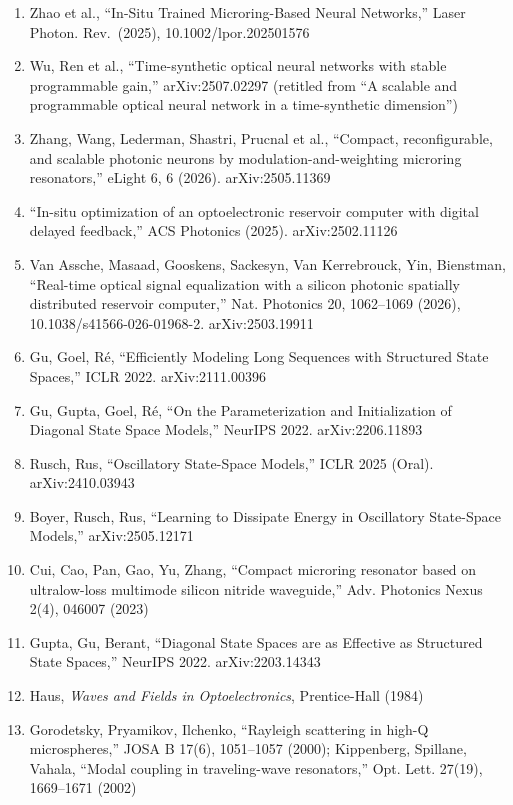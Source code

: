 \documentclass[
  10pt,
]{article}
\begin{document}
\begin{enumerate}
  arXiv:2506.14575
\item
  Zhao et al., ``In-Situ Trained Microring-Based Neural Networks,''
  Laser Photon. Rev.~(2025), 10.1002/lpor.202501576
\item
  Wu, Ren et al., ``Time-synthetic optical neural networks with stable
  programmable gain,'' arXiv:2507.02297 (retitled from ``A scalable and
  programmable optical neural network in a time-synthetic dimension'')
\item
  Zhang, Wang, Lederman, Shastri, Prucnal et al., ``Compact,
  reconfigurable, and scalable photonic neurons by
  modulation-and-weighting microring resonators,'' eLight 6, 6 (2026).
  arXiv:2505.11369
\item
  ``In-situ optimization of an optoelectronic reservoir computer with
  digital delayed feedback,'' ACS Photonics (2025). arXiv:2502.11126
\item
  Van Assche, Masaad, Gooskens, Sackesyn, Van Kerrebrouck, Yin,
  Bienstman, ``Real-time optical signal equalization with a silicon
  photonic spatially distributed reservoir computer,'' Nat. Photonics
  20, 1062--1069 (2026), 10.1038/s41566-026-01968-2. arXiv:2503.19911
\item
  Gu, Goel, Ré, ``Efficiently Modeling Long Sequences with Structured
  State Spaces,'' ICLR 2022. arXiv:2111.00396
\item
  Gu, Gupta, Goel, Ré, ``On the Parameterization and Initialization of
  Diagonal State Space Models,'' NeurIPS 2022. arXiv:2206.11893
\item
  Rusch, Rus, ``Oscillatory State-Space Models,'' ICLR 2025 (Oral).
  arXiv:2410.03943
\item
  Boyer, Rusch, Rus, ``Learning to Dissipate Energy in Oscillatory
  State-Space Models,'' arXiv:2505.12171
\item
  Cui, Cao, Pan, Gao, Yu, Zhang, ``Compact microring resonator based on
  ultralow-loss multimode silicon nitride waveguide,'' Adv. Photonics
  Nexus 2(4), 046007 (2023)
\item
  Gupta, Gu, Berant, ``Diagonal State Spaces are as Effective as
  Structured State Spaces,'' NeurIPS 2022. arXiv:2203.14343
\item
  Haus, \emph{Waves and Fields in Optoelectronics}, Prentice-Hall (1984)
\item
  Gorodetsky, Pryamikov, Ilchenko, ``Rayleigh scattering in high-Q
  microspheres,'' JOSA B 17(6), 1051--1057 (2000); Kippenberg, Spillane,
  Vahala, ``Modal coupling in traveling-wave resonators,'' Opt. Lett.
  27(19), 1669--1671 (2002)

\end{enumerate}
\end{document}
